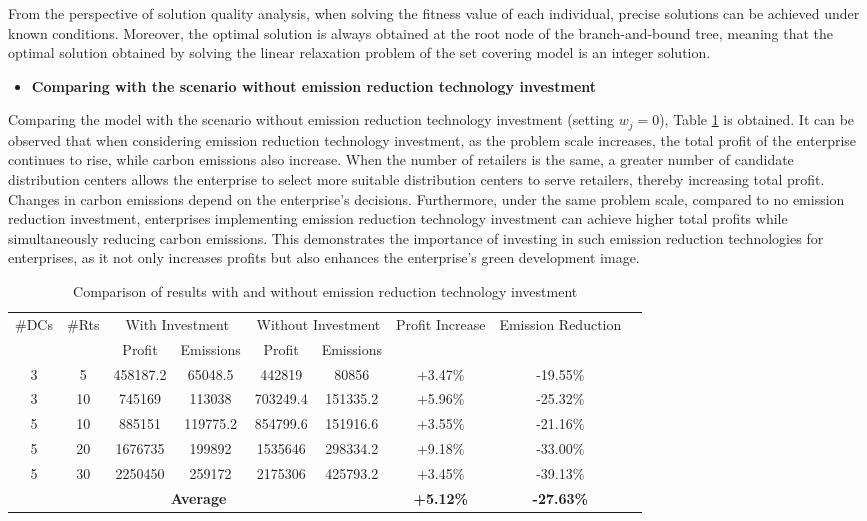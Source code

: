 \documentclass[]{article}
\theoremstyle{plain}%
\theoremstyle{definition}
\theoremstyle{remark}
\theoremstyle{plain}%
\begin{document}
    From the perspective of solution quality analysis, when solving the fitness value of each individual, precise solutions can be achieved under known conditions. Moreover, the optimal solution is always obtained at the root node of the branch-and-bound tree, meaning that the optimal solution obtained by solving the linear relaxation problem of the set covering model is an integer solution.
    \begin{itemize}
    \item \textbf{Comparing with the scenario without emission reduction technology investment}
    \end{itemize}
    
    Comparing the model with the scenario without emission reduction technology investment (setting $w_j=0$), Table \ref{tab:5-2} is obtained. It can be observed that when considering emission reduction technology investment, as the problem scale increases, the total profit of the enterprise continues to rise, while carbon emissions also increase. When the number of retailers is the same, a greater number of candidate distribution centers allows the enterprise to select more suitable distribution centers to serve retailers, thereby increasing total profit. Changes in carbon emissions depend on the enterprise's decisions. Furthermore, under the same problem scale, compared to no emission reduction investment, enterprises implementing emission reduction technology investment can achieve higher total profits while simultaneously reducing carbon emissions. This demonstrates the importance of investing in such emission reduction technologies for enterprises, as it not only increases profits but also enhances the enterprise's green development image.
    
    
    \begin{table}[htbp]
    \centering
    \caption{Comparison of results with and without emission reduction technology investment}
    \label{tab:5-2}
    \begin{tabular}{@{}ccccccccc@{}}
    \toprule
    \multirow{2}{*}{\#DCs} & \multirow{2}{*}{\#Rts} & \multicolumn{2}{c}{With Investment} & \multicolumn{2}{c}{Without Investment} & \multirow{2}{*}{Profit Increase} & \multirow{2}{*}{Emission Reduction} \\
    \cmidrule(lr){3-4} \cmidrule(lr){5-6}
     & & Profit & Emissions & Profit & Emissions & & \\
    \midrule
    3 & 5 & 458187.2 & 65048.5 & 442819 & 80856 & +3.47\% & -19.55\% \\
    3 & 10 & 745169 & 113038 & 703249.4 & 151335.2 & +5.96\% & -25.32\% \\
    5 & 10 & 885151 & 119775.2 & 854799.6 & 151916.6 & +3.55\% & -21.16\% \\
    5 & 20 & 1676735 & 199892 & 1535646 & 298334.2 & +9.18\% & -33.00\% \\
    5 & 30 & 2250450 & 259172 & 2175306 & 425793.2 & +3.45\% & -39.13\% \\
    \midrule
    \multicolumn{6}{c}{\textbf{Average}} & \textbf{+5.12\%} & \textbf{-27.63\%} \\
    \bottomrule
    \end{tabular}
    \end{table}
    
\end{document}
